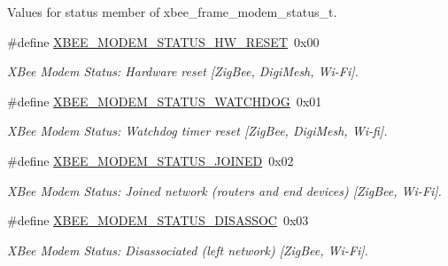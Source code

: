 \label{_amgrp01747264fe7bf50731df0522c351974e}%
Values for {\ttfamily status} member of xbee\+\_\+frame\+\_\+modem\+\_\+status\+\_\+t. \begin{DoxyCompactItemize}
\item 
\mbox{\label{group__xbee__device_ga28583d00e888ab4f17206ee70767aafa}} 
\#define \hyperlink{group__xbee__device_ga28583d00e888ab4f17206ee70767aafa}{X\+B\+E\+E\+\_\+\+M\+O\+D\+E\+M\+\_\+\+S\+T\+A\+T\+U\+S\+\_\+\+H\+W\+\_\+\+R\+E\+S\+ET}~0x00
\begin{DoxyCompactList}\small\item\em X\+Bee Modem Status\+: Hardware reset \mbox{[}Zig\+Bee, Digi\+Mesh, Wi-\/\+Fi\mbox{]}. \end{DoxyCompactList}\item 
\mbox{\label{group__xbee__device_gadb8d81ed3b25a11945a7a39a84255d72}} 
\#define \hyperlink{group__xbee__device_gadb8d81ed3b25a11945a7a39a84255d72}{X\+B\+E\+E\+\_\+\+M\+O\+D\+E\+M\+\_\+\+S\+T\+A\+T\+U\+S\+\_\+\+W\+A\+T\+C\+H\+D\+OG}~0x01
\begin{DoxyCompactList}\small\item\em X\+Bee Modem Status\+: Watchdog timer reset \mbox{[}Zig\+Bee, Digi\+Mesh, Wi-\/fi\mbox{]}. \end{DoxyCompactList}\item 
\mbox{\label{group__xbee__device_ga2e3f5ffd01da92dd4a25257d8bc005bc}} 
\#define \hyperlink{group__xbee__device_ga2e3f5ffd01da92dd4a25257d8bc005bc}{X\+B\+E\+E\+\_\+\+M\+O\+D\+E\+M\+\_\+\+S\+T\+A\+T\+U\+S\+\_\+\+J\+O\+I\+N\+ED}~0x02
\begin{DoxyCompactList}\small\item\em X\+Bee Modem Status\+: Joined network (routers and end devices) \mbox{[}Zig\+Bee, Wi-\/\+Fi\mbox{]}. \end{DoxyCompactList}\item 
\mbox{\label{group__xbee__device_ga5a5b4041876231e1516ccd621bc298db}} 
\#define \hyperlink{group__xbee__device_ga5a5b4041876231e1516ccd621bc298db}{X\+B\+E\+E\+\_\+\+M\+O\+D\+E\+M\+\_\+\+S\+T\+A\+T\+U\+S\+\_\+\+D\+I\+S\+A\+S\+S\+OC}~0x03
\begin{DoxyCompactList}\small\item\em X\+Bee Modem Status\+: Disassociated (left network) \mbox{[}Zig\+Bee, Wi-\/\+Fi\mbox{]}. \end{DoxyCompactList}\item 

\end{DoxyCompactItemize}
